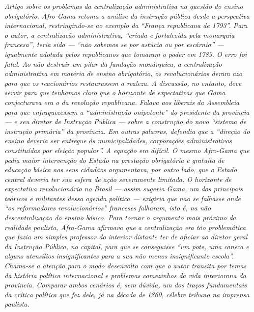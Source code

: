 \begin{didascalia}\itshape
Artigo sobre os problemas da
centralização administrativa na questão do ensino obrigatório. Afro-Gama
retoma a análise da instrução pública desde a perspectiva internacional,
restringindo-se ao exemplo da ``França republicana de 1793''.
Para o autor, a centralização administrativa, ``criada e fortalecida
pela monarquia francesa'', teria sido --- ``não sabemos se por astúcia ou
por escárnio'' --- igualmente adotada pelos republicanos que tomaram o
poder em 1789. O erro foi fatal. Ao não destruir um pilar da fundação
monárquica, a centralização administrativa em matéria de ensino
obrigatório, os revolucionários deram azo para que os
reacionários restaurassem a realeza. A discussão, no entanto, deve
servir para que tenhamos claro que o horizonte de expectativas que Gama
conjecturava era o da revolução republicana. Falava aos liberais da
Assembleia para que enfraquecessem a ``administração onipotente'' do
presidente da província --- e seu diretor de Instrução Pública --- sobre a
construção do novo ``sistema de instrução primária'' da província. Em
outras palavras, defendia que a ``direção do ensino deveria ser
entregue às municipalidades, corporações administrativas constituídas
por eleição popular''. A equação era difícil. O mesmo Afro-Gama
que pedia maior intervenção do Estado na prestação obrigatória e
gratuita de educação básica aos seus cidadãos argumentava, por outro
lado, que o Estado central deveria ter sua esfera de ação severamente
limitada. O horizonte de
expectativa revolucionário no Brasil --- assim sugeria Gama, um dos
principais teóricos e militantes dessa agenda política --- exigiria que
não se falhasse onde ``os reformadores revolucionários'' franceses
falharam, isto é, na não descentralização do ensino básico. Para tornar
o argumento mais próximo da realidade paulista, Afro-Gama
afirmava que a centralização era tão problemática que fazia um simples
professor do interior distante ter de oficiar ao diretor geral da
Instrução Pública, na capital, para que se conseguisse ``um pote, uma
caneca e alguns utensílios insignificantes para a sua não menos
insignificante escola''.
Chama-se a atenção para o modo
desenvolto com que o autor transita por temas da história
política internacional e problemas comezinhos da vida interiorana da
província. Comparar ambos cenários é, sem dúvida, um
dos traços fundamentais da crítica política que fez dele, já na década
de 1860, célebre tribuno na imprensa paulista.
\end{didascalia}



